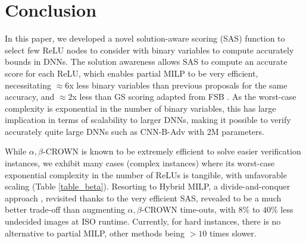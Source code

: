\documentclass{llncs}
\newcommand{\ReLU}{\mathrm{ReLU}}
\begin{document}
\iffalse
In some cases, the output is a vector but the aim to get the label of dimension with the minimal value. In this case, the problem can be written as:\begin{align*}
	\forall \boldsymbol{x} \in\mathcal{D} \  \min f(\boldsymbol{x}) = \min f(\boldsymbol{x}_0)
\end{align*}

If so, the question of verification can turn to the following optimization question: \begin{align*}
	\min f(\boldsymbol{x}) \ s.t. {\boldsymbol{z}}^{i} &= \boldsymbol{W}^i\cdot \hat{\boldsymbol{z}}^{(i-1)}+ b^i\\
	\hat{\boldsymbol{z}}^{i}(n) &= \sigma({\boldsymbol{z}}^i(n)), \boldsymbol{x}\in\mathcal{D}.
\end{align*}

In this paper, we only consider $\ReLU$ function as the activation function: $\sigma(a)=\ReLU(a)=\max(0,a)$. 

In this paper, we consider $L^{\infty}$ norm the max value of distance of each dimension, that is $d(\vx,\boldsymbol{x}_0)=\max |\boldsymbol{x}(n)-\boldsymbol{x}_0(n)|$. 
\fi


 









%




\section{Conclusion}
In this paper, we developed a novel solution-aware scoring ({\sf SAS}) function to select few ReLU nodes to consider with binary variables to compute accurately bounds in DNNs. 
The solution awareness allows SAS to compute an accurate score for each ReLU, which enables partial MILP to be very efficient, necessitating $\approx6$x less binary variables than previous proposals \cite{DivideAndSlide} for the same accuracy, and $\approx2$x less than {\sf GS} scoring adapted from FSB \cite{FSB}. As the worst-case complexity is exponential in the number of binary variables, this has large implication in terms of scalability to larger DNNs, making it possible to verify accurately quite large DNNs such as CNN-B-Adv with 2M parameters. 

While $\alpha,\beta$-CROWN is known to be extremely efficient to solve easier verification instances, we exhibit many cases (complex instances) where its worst-case exponential complexity in the number of ReLUs is tangible, with unfavorable scaling (Table \ref{table_beta}). Resorting to Hybrid MILP, a divide-and-conquer approach \cite{DivideAndSlide}, revisited thanks to the very efficient {\sf SAS}, revealed to be a much better trade-off than augmenting $\alpha,\beta$-CROWN time-outs, with $8\%$ to $40\%$ less undecided images at ISO runtime. Currently, for hard instances, there is no alternative to partial MILP, other methods being $>10$ times slower.
\end{document}
